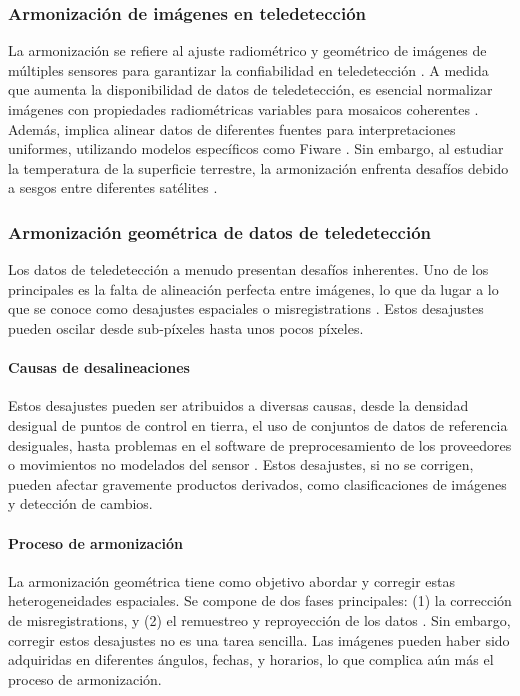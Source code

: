             \subsubsection{Armonización de imágenes en teledetección}
                La armonización se refiere al ajuste radiométrico y geométrico de imágenes de múltiples sensores para garantizar la confiabilidad en teledetección \autocite{ichikawa2022development}. A medida que aumenta la disponibilidad de datos de teledetección, es esencial normalizar imágenes con propiedades radiométricas variables para mosaicos coherentes \autocite{langheinrich2017enhanced}. Además, implica alinear datos de diferentes fuentes para interpretaciones uniformes, utilizando modelos específicos como Fiware \autocite{vosinakis2022data}. Sin embargo, al estudiar la temperatura de la superficie terrestre, la armonización enfrenta desafíos debido a sesgos entre diferentes satélites \autocite{adeniran2022cross}.
                
            \subsubsection{Armonización geométrica de datos de teledetección}
                Los datos de teledetección a menudo presentan desafíos inherentes. Uno de los principales es la falta de alineación perfecta entre imágenes, lo que da lugar a lo que se conoce como desajustes espaciales o misregistrations \autocite{storey2016note, wolfe2002achieving, yan2018sentinel}. Estos desajustes pueden oscilar desde sub-píxeles hasta unos pocos píxeles.
                
                \paragraph{Causas de desalineaciones}
                    Estos desajustes pueden ser atribuidos a diversas causas, desde la densidad desigual de puntos de control en tierra, el uso de conjuntos de datos de referencia desiguales, hasta problemas en el software de preprocesamiento de los proveedores o movimientos no modelados del sensor \autocite{storey2016note}. Estos desajustes, si no se corrigen, pueden afectar gravemente productos derivados, como clasificaciones de imágenes y detección de cambios.
                    
                \paragraph{Proceso de armonización}
                    La armonización geométrica tiene como objetivo abordar y corregir estas heterogeneidades espaciales. Se compone de dos fases principales: (1) la corrección de misregistrations, y (2) el remuestreo y reproyección de los datos \autocite{roy2000impact}. Sin embargo, corregir estos desajustes no es una tarea sencilla. Las imágenes pueden haber sido adquiridas en diferentes ángulos, fechas, y horarios, lo que complica aún más el proceso de armonización.
                    
